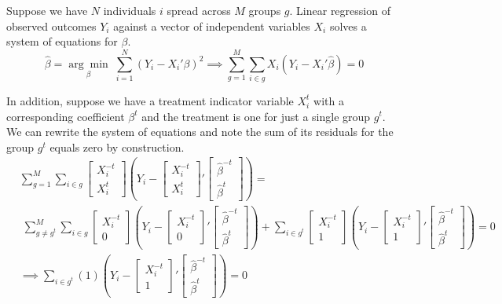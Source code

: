 \documentclass[12pt]{article}
\begin{document}
Suppose we have $N$ individuals $i$ spread across $M$ groups $g$. Linear regression of observed outcomes $Y_i$ against a vector of independent variables $X_i$ solves a system of equations for $\beta$. 
$$ \hat{\beta} = \underset{\beta}{\arg \min} \; \sum_{i=1}^{N} (Y_i - X_i' \beta)^2 \implies \sum_{g=1}^{M} \sum_{i \in g} X_i(Y_i - X_i' \hat{\beta}) = 0$$

In addition, suppose we have a treatment indicator variable $X_i^t$ with a corresponding coefficient $\beta^t$ and the treatment is one for just a single group $g^t$. We can rewrite the system of equations and note the sum of its residuals for the group $g^t$ equals zero by construction. 
\begin{align*}
& \sum_{g=1}^{M} \sum_{i \in g} \begin{bmatrix}
X_i^{-t} \\  X_i^t 
\end{bmatrix}(Y_i - \begin{bmatrix}
X_i^{-t} \\  X_i^t 
\end{bmatrix}' \begin{bmatrix}
\hat{\beta}^{-t} \\ \hat{\beta}^t 
\end{bmatrix}) = \\  & \; \sum_{g\ne g^t}^{M} \sum_{i \in g} \begin{bmatrix}
X_i^{-t} \\  0 
\end{bmatrix}(Y_i - \begin{bmatrix}
X_i^{-t} \\  0 
\end{bmatrix}' \begin{bmatrix}
\hat{\beta}^{-t} \\ \hat{\beta}^t 
\end{bmatrix}) + \sum_{i \in g^t} \begin{bmatrix}
X_i^{-t} \\  1 
\end{bmatrix}(Y_i - \begin{bmatrix}
X_i^{-t} \\  1 
\end{bmatrix}' \begin{bmatrix}
\hat{\beta}^{-t} \\ \hat{\beta}^t 
\end{bmatrix}) = 0 \\
& \implies \sum_{i \in g^t} (1) 
(Y_i - \begin{bmatrix}
X_i^{-t} \\  1 
\end{bmatrix}' \begin{bmatrix}
\hat{\beta}^{-t} \\ \hat{\beta}^t 
\end{bmatrix}) = 0
\end{align*}
\end{document}
